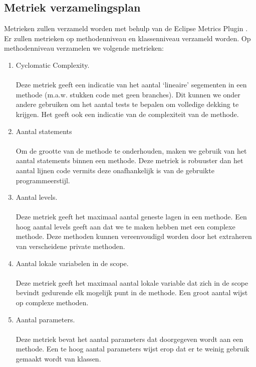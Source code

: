 \subsection{Metriek verzamelingsplan}
Metrieken zullen verzameld worden met behulp van de Eclipse Metrics Plugin \cite{EclipseMetricsPlugin}. Er zullen metrieken op methodenniveau en klassenniveau verzameld worden. Op methodenniveau verzamelen we volgende metrieken:
\begin{enumerate}
	\item 
		Cyclomatic Complexity.
		\\
		\\
		Deze metriek geeft een indicatie van het aantal `lineaire' segementen in een methode (m.a.w. stukken code met geen branches). Dit kunnen we onder andere gebruiken om het aantal tests te bepalen om volledige dekking te krijgen. Het geeft ook een indicatie van de complexiteit van de methode.
		
	\item 
		Aantal statements
		\\
		\\
		Om de grootte van de methode te onderhouden, maken we gebruik van het aantal statements binnen een methode. Deze metriek is robuuster dan het aantal lijnen code vermits deze onafhankelijk is van de gebruikte programmeerstijl.
	\item
		Aantal levels.
		\\
		\\
		Deze metriek geeft het maximaal aantal geneste lagen in een methode. Een hoog aantal levels geeft aan dat we te maken hebben met een complexe  methode. Deze methoden kunnen vereenvoudigd worden door het extraheren van verscheidene private methoden.
	
	\item
		Aantal lokale variabelen in de scope.
		\\
		\\
		Deze metriek geeft het maximaal aantal lokale variable dat zich in de scope bevindt gedurende elk mogelijk punt in de methode. Een groot aantal wijst op complexe methoden.
	\item
		Aantal parameters.
		\\
		\\
		Deze metriek bevat het aantal parameters dat doorgegeven wordt aan een methode. Een te hoog aantal parameters wijst erop dat er te weinig gebruik gemaakt wordt van klassen.
	

\end{enumerate}
